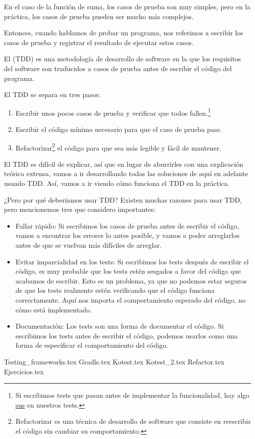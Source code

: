   En el caso de la función de suma, los casos de prueba son muy simples, pero en la práctica, los
  casos de prueba pueden ser mucho más complejos.

  Entonces, cuando hablamos de probar un programa, nos referimos a escribir los casos de prueba y
  registrar el resultado de ejecutar estos casos.

  \begin{defaultbox}
    El  (TDD) es una metodología de desarrollo de software en la que
    los requisitos del software son traducidos a casos de prueba antes de escribir el código del
    programa.
  \end{defaultbox}

  El TDD se separa en tres pasos:

  \begin{enumerate}
    \item Escribir unos pocos casos de prueba y verificar que todos fallen.\footnote{
        Si escribimos tests que pasan antes de implementar la funcionalidad, hay algo 
        \href{https://www.merriam-webster.com/words-at-play/what-does-sus-mean}{sus} en nuestros 
        tests.
      }
    \item Escribir el código mínimo necesario para que el caso de prueba pase.
    \item Refactorizar\footnote{
      Refactorizar es una técnica de desarrollo de software que consiste en reescribir el código sin 
      cambiar su comportamiento.
    } el código para que sea más legible y fácil de mantener.
  \end{enumerate}

  El TDD es difícil de explicar, así que en lugar de aburrirles con una explicación teórica extensa,
  vamos a ir desarrollando todas las soluciones de aquí en adelante usando TDD.
  Así, vamos a ir viendo cómo funciona el TDD en la práctica.

  ¿Pero por qué deberíamos usar TDD?
  Existen muchas razones para usar TDD, pero mencionemos tres que considero importantes:

  \begin{itemize}
    \item Fallar rápido: Si escribimos los casos de prueba antes de escribir el código, vamos a
      encontrar los errores lo antes posible, y vamos a poder arreglarlos antes de que se vuelvan
      más difíciles de arreglar.
    \item Evitar imparcialidad en los tests: Si escribimos los tests después de escribir el código,
      es muy probable que los tests estén sesgados a favor del código que acabamos de escribir.
      Esto es un problema, ya que no podemos estar seguros de que los tests realmente estén
      verificando que el código funciona correctamente.
      Aquí nos importa el comportamiento esperado del código, no cómo está implementado.
    \item Documentación: Los tests son una forma de documentar el código.
      Si escribimos los tests antes de escribir el código, podemos usarlos como una forma de
      especificar el comportamiento del código.
  \end{itemize}

  {Testing_frameworks.tex}
  {Gradle.tex}
  {Kotest.tex}
  {Kotest_2.tex}
  {Refactor.tex}
  {Ejercicios.tex}
  \printbibliography[keyword=tdd]
